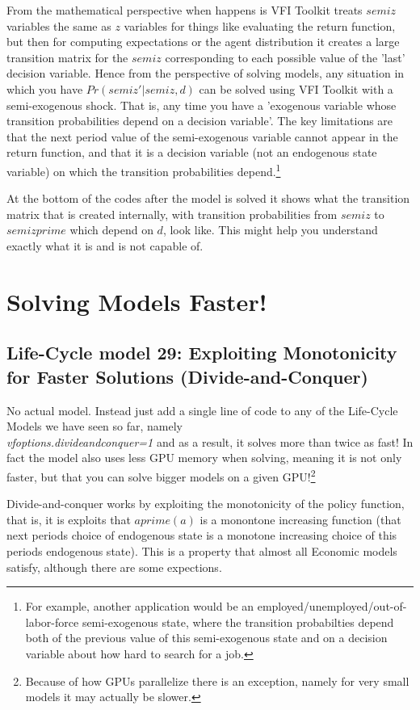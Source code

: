 From the mathematical perspective when happens is VFI Toolkit treats $semiz$ variables the same as $z$ variables for things like evaluating the return function, but then for computing expectations or the agent distribution it creates a large transition matrix for the $semiz$ corresponding to each possible value of the 'last' decision variable. Hence from the perspective of solving models, any situation in which you have $Pr(semiz'|semiz,d)$ can be solved using VFI Toolkit with a semi-exogenous shock. That is, any time you have a 'exogenous variable whose transition probabilities depend on a decision variable'. The key limitations are that the next period value of the semi-exogenous variable cannot appear in the return function, and that it is a decision variable (not an endogenous state variable) on which the transition probabilities depend.\footnote{For example, another application would be an employed/unemployed/out-of-labor-force semi-exogenous state, where the transition probabilties depend both of the previous value of this semi-exogenous state and on a decision variable about how hard to search for a job.}

At the bottom of the codes after the model is solved it shows what the transition matrix that is created internally, with transition probabilities from $semiz$ to $semizprime$ which depend on $d$, look like. This might help you understand exactly what it is and is not capable of.



\section{Solving Models Faster!}
\subsection{Life-Cycle model 29: Exploiting Monotonicity for Faster Solutions (Divide-and-Conquer)}
No actual model. Instead just add a single line of code to any of the Life-Cycle Models we have seen so far, namely
\\ \textit{vfoptions.divideandconquer=1}
and as a result, it solves more than twice as fast! In fact the model also uses less GPU memory when solving, meaning it is not only faster, but that you can solve bigger models on a given GPU!\footnote{Because of how GPUs parallelize there is an exception, namely for very small models it may actually be slower.}

Divide-and-conquer works by exploiting the monotonicity of the policy function, that is, it is exploits that $aprime(a)$ is a monontone increasing function (that next periods choice of endogenous state is a monotone increasing choice of this periods endogenous state). This is a property that almost all Economic models satisfy, although there are some expections.

